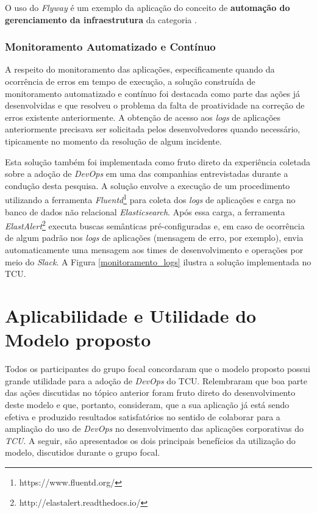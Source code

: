 O uso do {\it Flyway} é um exemplo da aplicação do conceito de {\bf automação do
gerenciamento da infraestrutura} da categoria .

\subsubsection{Monitoramento Automatizado e Contínuo}

A respeito do monitoramento das aplicações, especificamente quando da ocorrência
de erros em tempo de execução, a solução construída de
monitoramento automatizado e contínuo foi destacada como parte das ações já
desenvolvidas e que resolveu o problema da falta de proatividade na correção de
erros existente anteriormente. A obtenção de acesso aos {\it logs} de aplicações
anteriormente precisava ser solicitada pelos desenvolvedores quando necessário,
tipicamente no momento da resolução de algum incidente.

Esta solução também foi implementada como fruto direto da experiência
coletada sobre a adoção de {\it DevOps} em uma das companhias entrevistadas
durante a condução desta pesquisa. A solução envolve a execução de um
procedimento utilizando a ferramenta {\it Fluentd}\footnote{https://www.fluentd.org/}
para coleta dos {\it logs} de aplicações e carga no banco de dados não
relacional {\it Elasticsearch}. Após essa carga, a ferramenta {\it ElastAlert}\footnote{http://elastalert.readthedocs.io/}
executa buscas semânticas pré-configuradas e, em caso de ocorrência de algum
padrão nos {\it logs} de aplicações (mensagem de erro, por exemplo), envia
automaticamente uma mensagem aos times de desenvolvimento e operações por meio
do {\it Slack}. A Figura \ref{monitoramento_logs} ilustra a solução
implementada no \acrshort{TCU}.


\section{Aplicabilidade e Utilidade do Modelo proposto}

Todos os participantes do grupo focal concordaram que o modelo proposto possui
grande utilidade para a adoção de {\it DevOps} do \acrshort{TCU}. Relembraram
que boa parte das ações discutidas no tópico anterior foram fruto direto do
desenvolvimento deste modelo e que, portanto, consideram, que a sua aplicação
já está sendo efetiva e produzido resultados satisfatórios no sentido de colaborar
para a ampliação do uso de {\it DevOps} no desenvolvimento das aplicações
corporativas do {\it TCU}. A seguir, são apresentados os dois principais
benefícios da utilização do modelo, discutidos durante o grupo focal.

